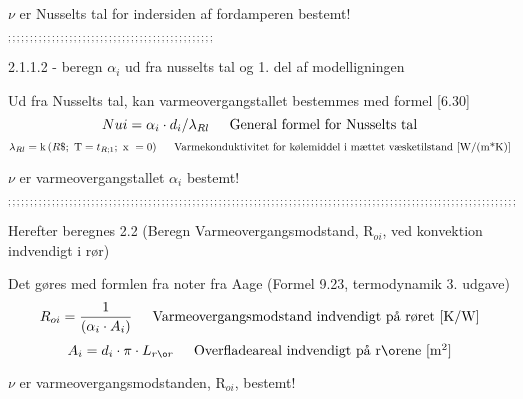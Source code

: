 \documentclass[../Hovedrapport.tex]{subfiles}
\newcommand{\F}[1]{\mbox{$#1$}}
\newcommand{\V}[1]{\mbox{$ #1 $}}
\newcommand{\I}{\mbox{\hspace{0.20in}}}
\newcommand{\conductivity}{\mathrm{k}}
\begin{document}
\vspace{0.10in}
\noindent
\rm $\nu$ er Nusselts tal for indersiden af fordamperen bestemt!

\vspace{0.10in}
\noindent
\rm $_{;;;;;;;;;;;;;;;;;;;;;;;;;;;;;;;;;;;;;;;;;;;;;;;}$

\vspace{0.10in}
\noindent
\rm 2.1.1.2 - beregn $\alpha$$_{i}$ ud fra nusselts tal og 1. del af modelligningen

\vspace{0.10in}
\noindent
\rm Ud fra Nusselts tal, kan varmeovergangstallet bestemmes med formel [6.30]
\begin{equation}
\label{EES Eqn:61}
\V{Nui}  = \alpha_{i} \cdot  d_{i}/\lambda_{Rl	} 
\mbox{\I General formel for Nusselts tal}
\end{equation}
\begin{equation}
\label{EES Eqn:62}
\lambda_{Rl} = \conductivity \left(\F{R}\$;\mbox{\ T}=t_{R;1};\mbox{\ x }= 0 \right)   	 
\mbox{\I Varmekonduktivitet for kølemiddel i mættet væsketilstand [W/(m*K)]}
\end{equation}

\vspace{0.10in}
\noindent
\rm $\nu$ er varmeovergangstallet $\alpha$$_{i}$ bestemt!

\vspace{0.10in}
\noindent
\rm $_{;;;;;;;;;;;;;;;;;;;;;;;;;;;;;;;;;;;;;;;;;;;;;;;;;;;;;;;;;;;;;;;;;;;;;;;;;;;;;;;;;;;;;;;;;;;;;;;;;;;;;;;;;;;;;;;;;;;;}$

\vspace{0.10in}
\noindent
\rm Herefter beregnes 2.2 (Beregn Varmeovergangsmodstand, R$_{oi}$, ved konvektion indvendigt i rør)

\vspace{0.10in}
\noindent
\rm Det gøres med formlen fra noter fra Aage (Formel 9.23, termodynamik 3. udgave)
\begin{equation}
\label{EES Eqn:63}
R_{oi} = \frac {1}{  \left( \alpha_{i} \cdot  A_{i} \right) 	 } 
\mbox{\I Varmeovergangsmodstand indvendigt på røret [K/W]}
\end{equation}
\begin{equation}
\label{EES Eqn:64}
A_{i} = d_{i} \cdot  \pi \cdot  L_{rør	} 
\mbox{\I Overfladeareal indvendigt på rørene [m$^{2}$]}
\end{equation}

\vspace{0.10in}
\noindent
\rm $\nu$ er varmeovergangsmodstanden, R$_{oi}$, bestemt!
\end{document}
